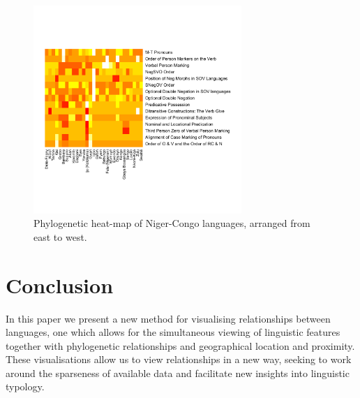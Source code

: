 \documentclass[11pt]{article}
\begin{document}
\begin{figure}[ht!]
\includegraphics[width=3.1in]
{graph3nigercongosmall.pdf} 
\caption{Phylogenetic heat-map of Niger-Congo languages, arranged from east to west.} 
\label{fig:heat2} 
\end{figure}


%
%
%


\section{Conclusion}
In this paper we present a new method for visualising relationships between languages, one which allows for the simultaneous viewing of linguistic features together with phylogenetic relationships and geographical location and proximity. These visualisations allow us to view relationships in a new way, seeking to work around the sparseness of available data and facilitate new insights into linguistic typology.
\end{document}
